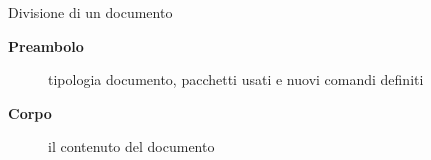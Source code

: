 \begin{frame}{Divisione di un documento}

\begin{description}
	\item [\textbf{Preambolo}] tipologia documento, pacchetti usati e nuovi comandi definiti
	\item [\textbf{Corpo}] il contenuto del documento
\end{description}

\end{frame}
